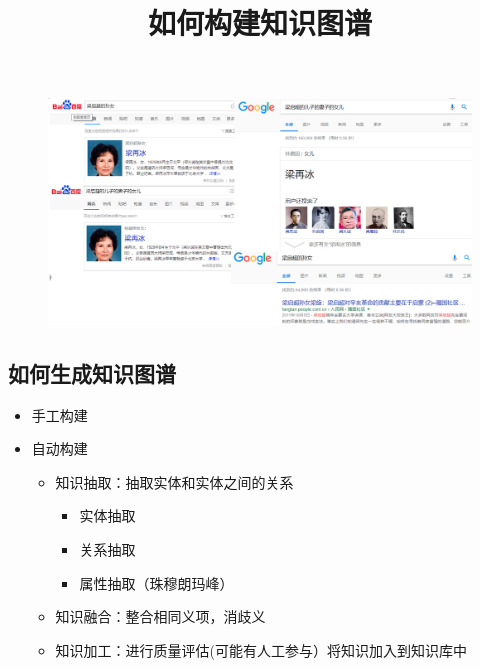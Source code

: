 \begin{frame}
	\begin{figure}[htbp]
		\centering
		\includegraphics[width=\textwidth, bb= 0 0 1000 400]{pic/kg/kg_example1.png}
	\end{figure}
\end{frame}

\subsection*{如何生成知识图谱}
\begin{frame}
	\title {如何构建知识图谱}
	\begin{itemize}
		\item 手工构建
		\item 自动构建
		\begin{itemize} 
			\item 知识抽取：抽取实体和实体之间的关系
			\begin{itemize} 
				\item 实体抽取
				\item 关系抽取
				\item 属性抽取（珠穆朗玛峰）
			\end{itemize}
			\item 知识融合：整合相同义项，消歧义
			\item 知识加工：进行质量评估(可能有人工参与）将知识加入到知识库中
		\end{itemize}
	\end{itemize}

\end{frame}

